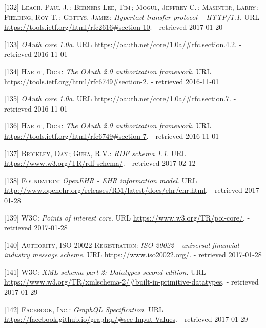 \documentclass[12pt,english,a4paper,titlepage,cleardoublepage=empty,dottedtoc]{report}
\begin{document}
\hypertarget{ref-web_spec_http-error-codes}{}
{[}132{]} \textsc{Leach, Paul J.}\,; \textsc{Berners-Lee, Tim}\,;
\textsc{Mogul, Jeffrey C.}\,; \textsc{Masinter, Larry}\,;
\textsc{Fielding, Roy T.}\,; \textsc{Gettys, James}: \emph{Hypertext
transfer protocol -- HTTP/1.1}. URL
\url{https://tools.ietf.org/html/rfc2616\#section-10}. - retrieved
2017-01-20

\hypertarget{ref-web_spec_oauth-1a_client-reg}{}
{[}133{]} \emph{OAuth core 1.0a}. URL
\url{https://oauth.net/core/1.0a/\#rfc.section.4.2}. - retrieved
2016-11-01

\hypertarget{ref-web_spec_oauth-2_client-reg}{}
{[}134{]} \textsc{Hardt, Dick}: \emph{The OAuth 2.0 authorization
framework}. URL \url{https://tools.ietf.org/html/rfc6749\#section-2}. -
retrieved 2016-11-01

\hypertarget{ref-web_spec_oauth-1a_access-verification}{}
{[}135{]} \emph{OAuth core 1.0a}. URL
\url{https://oauth.net/core/1.0a/\#rfc.section.7}. - retrieved
2016-11-01

\hypertarget{ref-web_spec_oauth-2_access-verification}{}
{[}136{]} \textsc{Hardt, Dick}: \emph{The OAuth 2.0 authorization
framework}. URL \url{https://tools.ietf.org/html/rfc6749\#section-7}. -
retrieved 2016-11-01

\hypertarget{ref-web_w3c-tr_rdf-schemas}{}
{[}137{]} \textsc{Brickley, Dan}\,; \textsc{Guha, R.V.}: \emph{RDF
schema 1.1}. URL \url{https://www.w3.org/TR/rdf-schema/}. - retrieved
2017-02-12

\hypertarget{ref-web_spec_data-schemas_ehr}{}
{[}138{]} \textsc{Foundation}: \emph{OpenEHR - EHR information model}.
URL \url{http://www.openehr.org/releases/RM/latest/docs/ehr/ehr.html}. -
retrieved 2017-01-28

\hypertarget{ref-web_spec_data-schemas_poi}{}
{[}139{]} \textsc{W3C}: \emph{Points of interest core}. URL
\url{https://www.w3.org/TR/poi-core/}. - retrieved 2017-01-28

\hypertarget{ref-web_spec_data-schemas_bank-transfer}{}
{[}140{]} \textsc{Authority, ISO 20022 Registration}: \emph{ISO 20022 -
universal financial industry message scheme}. URL
\url{https://www.iso20022.org/}. - retrieved 2017-01-28

\hypertarget{ref-web_spec_xml_types}{}
{[}141{]} \textsc{W3C}: \emph{XML schema part 2: Datatypes second
edition}. URL
\url{https://www.w3.org/TR/xmlschema-2/\#built-in-primitive-datatypes}.
- retrieved 2017-01-29

\hypertarget{ref-web_spec_graphql_types}{}
{[}142{]} \textsc{Facebook, Inc.}: \emph{GraphQL Specification}. URL
\url{https://facebook.github.io/graphql/\#sec-Input-Values}. - retrieved
2017-01-29
\end{document}
